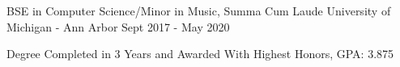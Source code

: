 \documentclass[]{awesome-cv}
\begin{document}



\vspace{-4mm}
\vspace{-2mm}
\cventry
	{BSE in Computer Science/Minor in Music, Summa Cum Laude}
	{University of Michigan - Ann Arbor}
	{}
	{Sept 2017 - May 2020}
	{\begin{cvitems}
		\item{Degree Completed in 3 Years and Awarded With Highest Honors, GPA: 3.875}
		\end{cvitems}}
\end{document}

